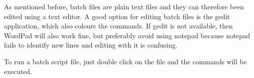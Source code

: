 \documentclass{article}
\begin{document}
	\par As mentioned before, batch files are plain text files and they can therefore been edited using a text editor. A good option for editing batch files is the gedit application, which also colours the commands. If gedit is not available, then WordPad will also work fine, but preferably avoid using notepad because notepad fails to identify new lines and editing with it is confusing. 
	
	\par To run a batch script file, just double click on the file and the commands will be executed. 
	
\end{document}
